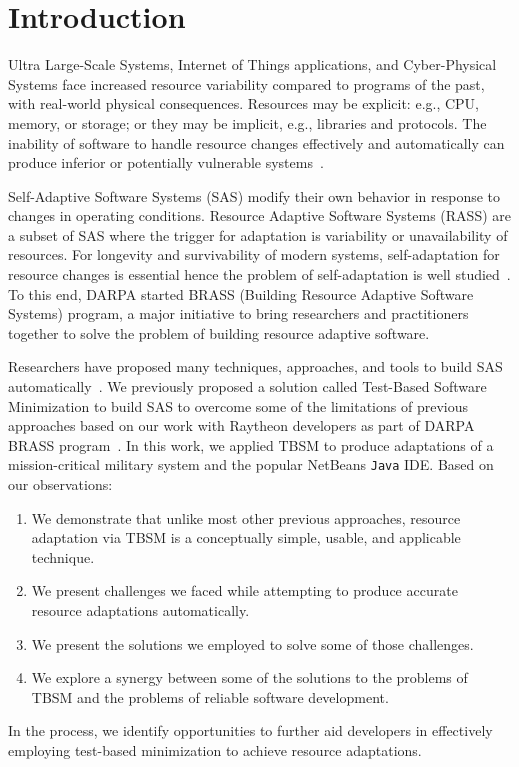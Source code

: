 \section{Introduction}

Ultra Large-Scale Systems, Internet of Things applications, and Cyber-Physical Systems face increased resource variability compared to programs of the past, with real-world physical consequences.  Resources may be explicit: e.g., CPU, memory, or storage; or they may be implicit, e.g., libraries and protocols. The inability of software to handle resource changes effectively and automatically can produce inferior or potentially vulnerable systems~\cite{hughes2016building}. 

Self-Adaptive Software Systems (SAS) modify their own behavior in response to changes in operating conditions. Resource Adaptive Software Systems (RASS) are a subset of SAS where the trigger for adaptation is variability or unavailability of resources. For longevity and survivability of modern systems, self-adaptation for resource changes is essential hence the problem of self-adaptation is well studied~\cite{seams2018keynote}. To this end, DARPA started BRASS (Building Resource Adaptive Software Systems) program, a major initiative to bring researchers and practitioners together to solve the problem of building resource adaptive software. 

Researchers have proposed many techniques, approaches, and tools to build SAS automatically~\cite{hughes2016building,salehie2009selfadaptive,krupitzer2015a}. We previously proposed a solution called Test-Based Software Minimization to build SAS to overcome some of the limitations of previous approaches based on our work with Raytheon developers as part of DARPA BRASS program~\cite{christi2017saso}. In this work, we applied TBSM to produce adaptations of a mission-critical military system and the popular NetBeans \texttt{Java} IDE.  Based on our observations: 
\begin{enumerate}
\item {We demonstrate that unlike most other previous approaches, resource adaptation via TBSM is a conceptually simple, usable, and applicable technique. }
\item {We present challenges we faced while attempting to produce accurate resource adaptations automatically. }
\item {We present the solutions we employed to solve some of those challenges. }
\item {We explore a synergy between some of the solutions to the problems of TBSM and the problems of reliable software development.}
\end{enumerate}

In the process, we identify opportunities to further aid developers in effectively employing test-based minimization to achieve resource adaptations. 





